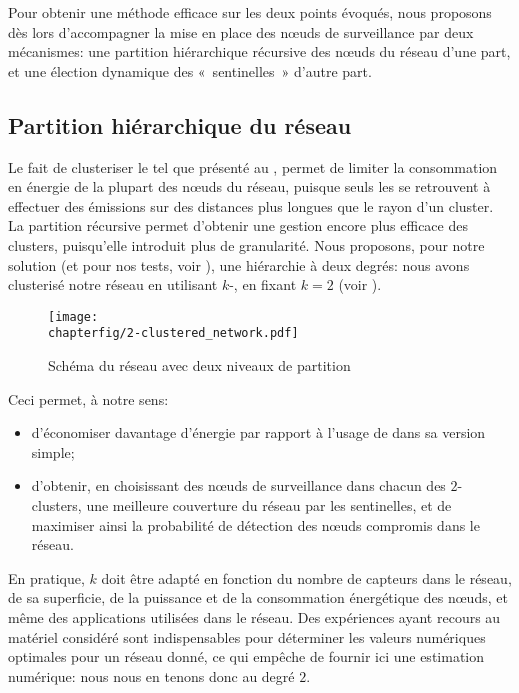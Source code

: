 Pour obtenir une méthode efficace sur les deux points évoqués, nous proposons dès lors d'accompagner la mise en place des nœuds de surveillance par deux mécanismes: une partition hiérarchique récursive des nœuds du réseau d'une part, et une élection dynamique des « sentinelles » d'autre part.

    \subsection{Partition hiérarchique du réseau}

Le fait de clusteriser le \rc tel que présenté au ,  permet de limiter la consommation en énergie de la plupart des nœuds du réseau, puisque seuls les \chs se retrouvent à effectuer des émissions sur des distances plus longues que le rayon d'un cluster.
La partition récursive permet d'obtenir une gestion encore plus efficace des clusters, puisqu'elle introduit plus de granularité.
Nous proposons, pour notre solution (et pour nos tests, voir ), une hiérarchie à deux degrés: nous avons clusterisé notre réseau en utilisant $k$-\leach, en fixant $k=2$ (voir ).
\begin{figure}[ht]
    \centering
    \texttt{[image: \\chapterfig/2-clustered\_network.pdf]}
    \caption{Schéma du réseau avec deux niveaux de partition}\label{sa:fig:network}
\end{figure}
Ceci permet, à notre sens:
\begin{itemize}
    \item d'économiser davantage d'énergie par rapport à l'usage de \leach dans sa version simple;
    \item d'obtenir, en choisissant des nœuds de surveillance dans chacun des $2$-clusters, une meilleure couverture du réseau par les sentinelles, et de maximiser ainsi la probabilité de détection des nœuds compromis dans le réseau.
\end{itemize}
En pratique, $k$ doit être adapté en fonction du nombre de capteurs dans le réseau, de sa superficie, de la puissance et de la consommation énergétique des nœuds, et même des applications utilisées dans le réseau.
Des expériences ayant recours au matériel considéré sont indispensables pour déterminer les valeurs numériques optimales pour un réseau donné, ce qui empêche de fournir ici une estimation numérique: nous nous en tenons donc au degré $2$.

